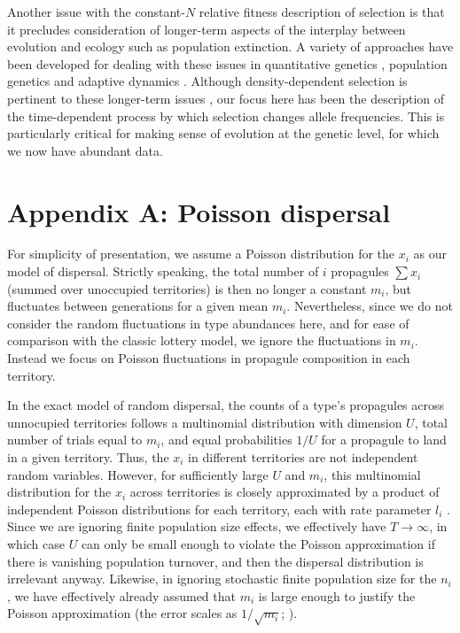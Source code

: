 \documentclass[12pt]{article}
\begin{document}
Another issue with the constant-$N$ relative fitness description of selection is that it precludes consideration of longer-term aspects of the interplay between evolution and ecology such as population extinction. A variety of approaches have been developed for dealing with these issues in quantitative genetics \citep{burger1995evolution,engen_2013}, population genetics \citep{bertram2017predicting} and adaptive dynamics \citep{ferriere2013eco,dieckmann2004adaptive}. Although density-dependent selection is  pertinent to these longer-term issues \citep{travis_2013}, our focus here has been the description of the time-dependent process by which selection changes allele frequencies. This is particularly critical for making sense of evolution at the genetic level, for which we now have abundant data.



 

\section*{Appendix A: Poisson dispersal}

For simplicity of presentation, we assume a Poisson distribution for the $x_i$ as our model of dispersal. Strictly speaking, the total number of $i$ propagules $\sum x_i$ (summed over unoccupied territories) is then no longer a constant $m_i$, but fluctuates between generations for a given mean $m_i$. Nevertheless, since we do not consider the random fluctuations in type abundances here, and for ease of comparison with the classic lottery model, we ignore the fluctuations in $m_i$. Instead we focus on Poisson fluctuations in propagule composition in each territory. 

In the exact model of random dispersal, the counts of a type's propagules across unnocupied territories follows a multinomial distribution with dimension $U$, total number of trials equal to $m_i$, and equal probabilities $1/U$ for a propagule to land in a given territory. Thus, the $x_i$ in different territories are not independent random variables. However, for sufficiently large $U$ and $m_i$, this multinomial distribution for the $x_i$ across territories is closely approximated by a product of independent Poisson distributions for each territory, each with rate parameter $l_i$ \citep[Theorem 1]{arenbaev_1977}. Since we are ignoring finite population size effects, we effectively have $T\rightarrow \infty$, in which case $U$ can only be small enough to violate the Poisson approximation if there is vanishing population turnover, and then the dispersal distribution is irrelevant anyway. Likewise, in ignoring stochastic finite population size for the $n_i$, we have effectively already assumed that $m_i$ is large enough to justify the Poisson approximation (the error scales as $1/\sqrt{m_i}$; \citealt{arenbaev_1977}).
\end{document}
